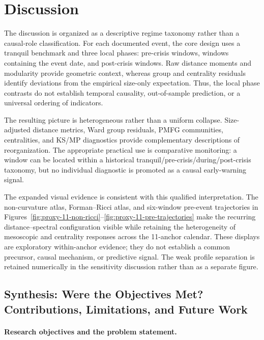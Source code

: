 \documentclass[a4paper,fleqn,review]{cas-sc}
\begin{document}
\section{Discussion}
\label{sec:discussion}

The discussion is organized as a descriptive regime taxonomy rather than a causal-role classification. For each documented event, the core design uses a tranquil benchmark and three local phases: pre-crisis windows, windows containing the event date, and post-crisis windows. Raw distance moments and modularity provide geometric context, whereas group and centrality residuals identify deviations from the empirical size-only expectation. Thus, the local phase contrasts do not establish temporal causality, out-of-sample prediction, or a universal ordering of indicators.

The resulting picture is heterogeneous rather than a uniform collapse. Size-adjusted distance metrics, Ward group residuals, PMFG communities, centralities, and KS/MP diagnostics provide complementary descriptions of reorganization. The appropriate practical use is comparative monitoring: a window can be located within a historical tranquil/pre-crisis/during/post-crisis taxonomy, but no individual diagnostic is promoted as a causal early-warning signal.

The expanded visual evidence is consistent with this qualified interpretation. The non-curvature atlas, Forman--Ricci atlas, and six-window pre-event trajectories in Figures~\ref{fig:proxy-11-non-ricci}--\ref{fig:proxy-11-pre-trajectories} make the recurring distance--spectral configuration visible while retaining the heterogeneity of mesoscopic and centrality responses across the 11-anchor calendar. These displays are exploratory within-anchor evidence; they do not establish a common precursor, causal mechanism, or predictive signal. The weak profile separation is retained numerically in the sensitivity discussion rather than as a separate figure.

\subsection{Synthesis: Were the Objectives Met? Contributions, Limitations, and Future Work}
\label{sec:synthesis}

\paragraph{Research objectives and the problem statement.}
\end{document}
